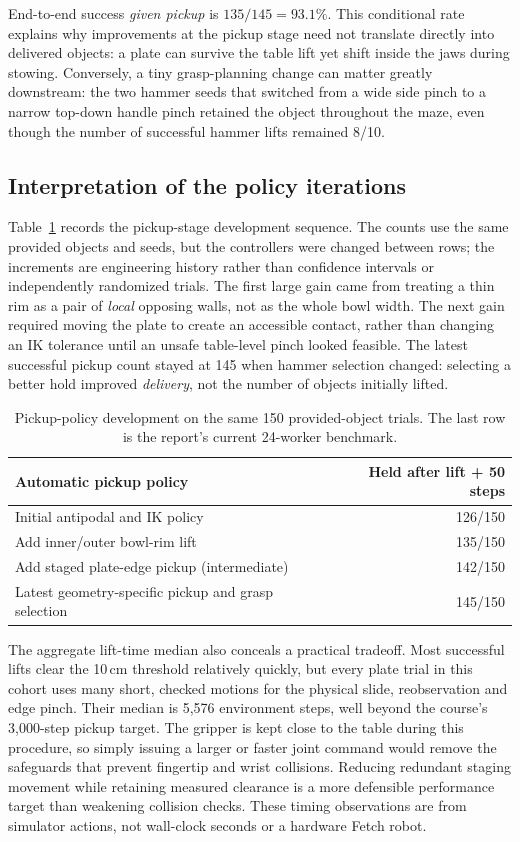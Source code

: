 \documentclass[10pt,a4paper]{article}
\begin{document}
End-to-end success \emph{given pickup} is $135/145=93.1\%$. This conditional
rate explains why improvements at the pickup stage need not translate
directly into delivered objects: a plate can survive the table lift yet
shift inside the jaws during stowing. Conversely, a tiny grasp-planning
change can matter greatly downstream: the two hammer seeds that switched
from a wide side pinch to a narrow top-down handle pinch retained the object
throughout the maze, even though the number of successful hammer lifts
remained 8/10.

\subsection{Interpretation of the policy iterations}
Table~\ref{tab:iterations} records the pickup-stage development sequence.
The counts use the same provided objects and seeds, but the controllers were
changed between rows; the increments are engineering history rather than
confidence intervals or independently randomized trials. The first large
gain came from treating a thin rim as a pair of \emph{local} opposing walls,
not as the whole bowl width. The next gain required moving the plate to create
an accessible contact, rather than changing an IK tolerance until an unsafe
table-level pinch looked feasible. The latest successful pickup count stayed
at 145 when hammer selection changed: selecting a better hold improved
\emph{delivery}, not the number of objects initially lifted.

\begin{table}[H]
\centering\small
\caption{Pickup-policy development on the same 150 provided-object trials.
The last row is the report's current 24-worker benchmark.}
\label{tab:iterations}
\begin{tabular}{@{}lr@{}}
\toprule
Automatic pickup policy & Held after lift + 50 steps\\
\midrule
Initial antipodal and IK policy & 126/150\\
Add inner/outer bowl-rim lift & 135/150\\
Add staged plate-edge pickup (intermediate) & 142/150\\
Latest geometry-specific pickup and grasp selection & 145/150\\
\bottomrule
\end{tabular}
\end{table}

The aggregate lift-time median also conceals a practical tradeoff. Most
successful lifts clear the 10\,cm threshold relatively quickly, but every
plate trial in this cohort uses many short, checked motions for the physical
slide, reobservation and edge pinch. Their median is 5,576 environment steps,
well beyond the course's 3,000-step pickup target. The gripper is kept close
to the table during this procedure, so simply issuing a larger or faster
joint command would remove the safeguards that prevent fingertip and wrist
collisions. Reducing redundant staging movement while retaining measured
clearance is a more defensible performance target than weakening collision
checks. These timing observations are from simulator actions, not wall-clock
seconds or a hardware Fetch robot.
\end{document}
